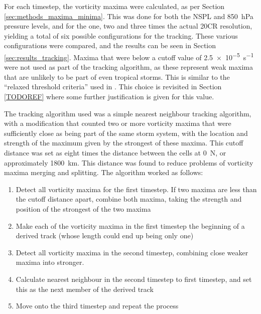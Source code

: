 \documentclass[pdftex,12pt,a4paper]{report}
\begin{document}
For each timestep, the vorticity maxima were calculated, as per Section
\ref{sec:methods_maxima_minima}. This was done for both the NSPL and \SI{850}{hPa} pressure
levels, and for the one, two and three times the actual 20CR resolution, yielding a total of six
possible configurations for the tracking. These various configurations were compared, and the
results can be seen in Section \ref{sec:results_tracking}. Maxima that were below a cutoff value
of \SI{2.5e-5}{s^{-1}} were not used as part of the tracking algorithm, as these represent weak maxima
that are unlikely to be part of even tropical storms. This is similar to the ``relaxed threshold
criteria'' used in \textcite{camargo2002improving}. This choice is revisited in Section
\ref{TODOREF} where some further justification is given for this value.

The tracking algorithm used was a simple nearest neighbour tracking algorithm, with a modification
that counted two or more vorticity maxima that were sufficiently close as being part of the same storm
system, with the location and strength of the maximum given by the strongest of
these maxima. This cutoff distance was set as eight times the distance between the cells at
0\textdegree\ N, or approximately \SI{1800}{km}. This distance was found to reduce problems of
vorticity maxima merging and splitting. The algorithm worked as follows:

\begin{enumerate}
    \item Detect all vorticity maxima for the first timestep. If two maxima are less than the cutoff
        distance apart, combine both maxima, taking the strength and position of the strongest of
        the two maxima
    \item Make each of the vorticity maxima in the first timestep the beginning of a derived track
        (whose length could end up being only one)
    \item Detect all vorticity maxima in the second timestep, combining close weaker maxima into
        stronger. %
    \item Calculate nearest neighbour in the second timestep to first timestep, and set this as the
        next member of the derived track
    \item Move onto the third timestep and repeat the process
\end{enumerate}
\end{document}
